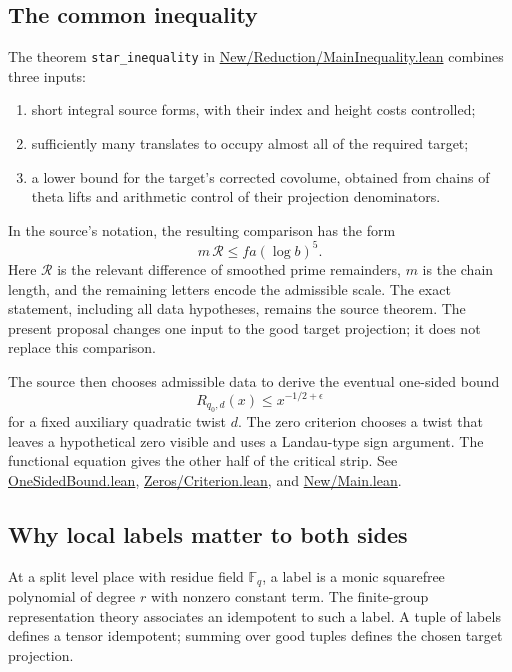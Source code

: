 \documentclass[11pt,a4paper]{article}
\theoremstyle{definition}
\theoremstyle{remark}
\newcommand{\F}{\mathbb F}
\newcommand{\code}[1]{{\small\nolinkurl{#1}}}
\newcommand{\src}[2]{\href{https://github.com/VladimirReshetnikov/ProveIt/blob/89d12dd40424f1217fd818d84877b3da52396a3b/Analysis/GeneralizedRiemannHypothesis/Lean/grh/src/#1.lean}{#2}}
\begin{document}
\subsection{The common inequality}

The theorem \code{star_inequality} in
\src{New/Reduction/MainInequality}{New/Reduction/MainInequality.lean}
combines three inputs:

\begin{enumerate}
\item short integral source forms, with their index and height costs controlled;
\item sufficiently many translates to occupy almost all of the required target;
\item a lower bound for the target's corrected covolume, obtained from chains of
theta lifts and arithmetic control of their projection denominators.
\end{enumerate}

In the source's notation, the resulting comparison has the form
\[
      m\,\mathcal R \le f a(\log b)^5 .
\]
Here \(\mathcal R\) is the relevant difference of smoothed prime remainders, \(m\)
is the chain length, and the remaining letters encode the admissible scale.
The exact statement, including all data hypotheses, remains the source theorem.
The present proposal changes one input to the good target projection; it does not
replace this comparison.

The source then chooses admissible data to derive the eventual one-sided bound
\[
             R_{q_0,d}(x)\le x^{-1/2+\epsilon}
\]
for a fixed auxiliary quadratic twist \(d\).
The zero criterion chooses a twist that leaves a hypothetical zero visible and
uses a Landau-type sign argument. The functional equation gives the other half
of the critical strip. See
\src{New/Reduction/OneSidedBound}{OneSidedBound.lean},
\src{New/Reduction/Zeros/Criterion}{Zeros/Criterion.lean}, and
\src{New/Main}{New/Main.lean}.

\subsection{Why local labels matter to both sides}

At a split level place with residue field \(\F_q\), a label is a monic squarefree
polynomial of degree \(r\) with nonzero constant term. The finite-group
representation theory associates an idempotent to such a label. A tuple of labels
defines a tensor idempotent; summing over good tuples defines the chosen target
projection.
\end{document}
